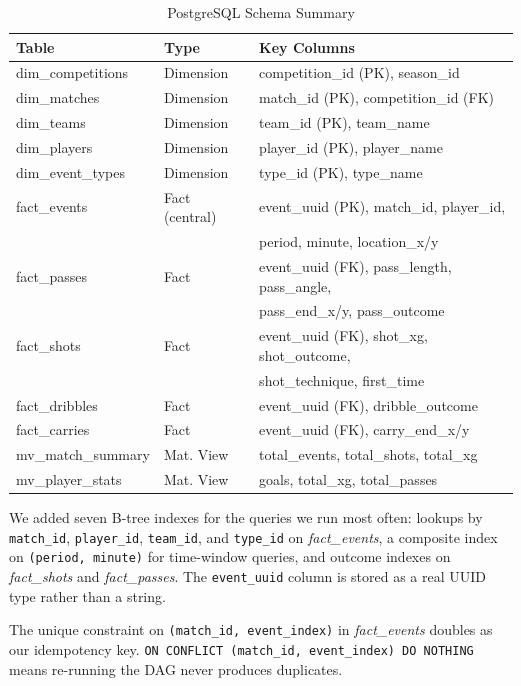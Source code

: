 \documentclass[conference]{IEEEtran}
\begin{document}
\begin{table}[ht]
\caption{PostgreSQL Schema Summary}
\label{tab:schema}
\renewcommand{\arraystretch}{1.1}
\begin{tabular}{@{}lll@{}}
\toprule
\textbf{Table} & \textbf{Type} & \textbf{Key Columns} \\
\midrule
dim\_competitions & Dimension & competition\_id (PK), season\_id \\
dim\_matches & Dimension & match\_id (PK), competition\_id (FK) \\
dim\_teams & Dimension & team\_id (PK), team\_name \\
dim\_players & Dimension & player\_id (PK), player\_name \\
dim\_event\_types & Dimension & type\_id (PK), type\_name \\
fact\_events & Fact (central) & event\_uuid (PK), match\_id, player\_id, \\
             &               & period, minute, location\_x/y \\
fact\_passes & Fact & event\_uuid (FK), pass\_length, pass\_angle, \\
             &      & pass\_end\_x/y, pass\_outcome \\
fact\_shots & Fact & event\_uuid (FK), shot\_xg, shot\_outcome, \\
            &      & shot\_technique, first\_time \\
fact\_dribbles & Fact & event\_uuid (FK), dribble\_outcome \\
fact\_carries & Fact & event\_uuid (FK), carry\_end\_x/y \\
mv\_match\_summary & Mat. View & total\_events, total\_shots, total\_xg \\
mv\_player\_stats & Mat. View & goals, total\_xg, total\_passes \\
\bottomrule
\end{tabular}
\end{table}

We added seven B-tree indexes for the queries we run most often: lookups by
\texttt{match\_id}, \texttt{player\_id}, \texttt{team\_id}, and
\texttt{type\_id} on \textit{fact\_events}, a composite index on
\texttt{(period, minute)} for time-window queries, and outcome indexes on
\textit{fact\_shots} and \textit{fact\_passes}. The \texttt{event\_uuid}
column is stored as a real UUID type rather than a string.

The unique constraint on \texttt{(match\_id, event\_index)} in
\textit{fact\_events} doubles as our idempotency key.
\texttt{ON CONFLICT (match\_id, event\_index) DO NOTHING} means re-running the
DAG never produces duplicates.
\end{document}
